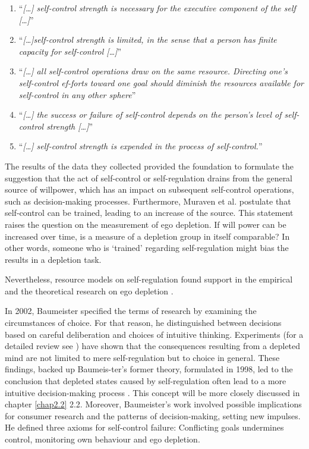 \begin{enumerate} [1.]
\item “\emph{[\ldots] self-control strength is necessary for the executive component of the self [\ldots]}” \citep[p.~248]{muraven2000self}
\item “\emph{[\ldots]self-control strength is limited, in the sense that a person has finite capacity for self-control [\ldots]}” \citep[p.~248]{muraven2000self}
\item “\emph{[\ldots] all self-control operations draw on the same resource. Directing one's self-control ef-forts toward one goal should diminish the resources available for self-control in any other sphere}” \citep[p.~248]{muraven2000self}
\item “\emph{[\ldots] the success or failure of self-control depends on the person's level of self-control strength [\ldots]}” \citep[p.~248]{muraven2000self}
\item “\emph{[\ldots] self-control strength is expended in the process of self-control.}” \citep[p.~248]{muraven2000self}
\end{enumerate}
The results of the data they collected provided the foundation to formulate the suggestion that the act of self-control or self-regulation drains from the general source of willpower, which has an impact on subsequent self-control operations, such as decision-making processes. Furthermore, Muraven et al. postulate that self-control can be trained, leading to an increase of the source. This statement raises the question on the measurement of ego depletion. If will power can be increased over time, is a measure of a depletion group in itself comparable? In other words, someone who is ‘trained’ regarding self-regulation might bias the results in a depletion task.\par
Nevertheless, resource models on self-regulation found support in the empirical and the theoretical research on ego depletion \citep{mischel1996good,gross1998emerging,vohs2000self} .\par
In 2002, Baumeister \citep{baumeister2002yielding}  specified the terms of research by examining the circumstances of choice. For that reason, he distinguished between decisions based on careful deliberation and choices of intuitive thinking. Experiments (for a detailed review see \cite{vohs2000self}) have shown that the consequences resulting from a depleted mind are not limited to mere self-regulation but to choice in general. These findings, backed up Baumeis-ter’s former theory, formulated in 1998, led to the conclusion that depleted states caused by self-regulation often lead to a more intuitive decision-making process \citep{pocheptsova2009deciding}. This concept will be more closely discussed in chapter \ref{chap2.2} 2.2. Moreover, Baumeister’s work involved possible implications for consumer research and the patterns of decision-making, setting new impulses. He defined three axioms for self-control failure: Conflicting goals undermines control, monitoring own behaviour and ego depletion. \par
